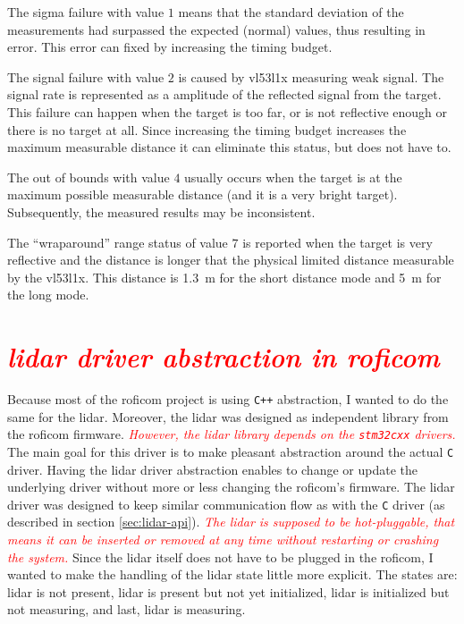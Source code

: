 \documentclass[
  digital,     %
  oneside,     %
  nosansbold,  %
  nocolorbold, %
  lof,         %
  lot,         %
]{fithesis4}
\newcommand{\TODO}[1]{\textcolor{red}{\textit{#1}}}
\begin{document}
{{{The sigma failure with value $1$ means that the standard deviation of the measurements had surpassed the expected (normal) values, thus resulting in error. This error can fixed by increasing the timing budget.

The signal failure with value $2$ is caused by \gls{vl53l1x} measuring weak signal. The signal rate is represented as a amplitude of the reflected signal from the target. This failure can happen when the target is too far, or is not reflective enough or there is no target at all. Since increasing the timing budget increases the maximum measurable distance it can eliminate this status, but does not have to.

The out of bounds with value $4$ usually occurs when the target is at the maximum possible measurable distance (and it is a very bright target). Subsequently, the measured results may be inconsistent.

The ``wraparound'' range status of value $7$ is reported when the target is very reflective and the distance is longer that the physical limited distance measurable by the \gls{vl53l1x}. This distance is \qty{1.3}{\metre} for the short distance mode and \qty{5}{\metre} for the long mode.

\section{ \TODO{ \acrshort{lidar} driver abstraction in \acrshort{roficom} } } \label{sec:lidar-driver}

Because most of the \acrshort{roficom} project is using \verb|C++| abstraction, I wanted to do the same for the \acrshort{lidar}. Moreover, the \acrshort{lidar} was designed as independent library from the \acrshort{roficom} firmware. \TODO{However, the \acrshort{lidar} library depends on the \texttt{stm32cxx} drivers.} The main goal for this driver is to make pleasant abstraction around the actual \verb|C| driver. Having the \acrshort{lidar} driver abstraction enables to change or update the underlying driver without more or less changing the \acrshort{roficom}'s firmware. The \acrshort{lidar} driver was designed to keep similar communication flow as with the \verb|C| driver (as described in section \ref{sec:lidar-api}). \TODO{The \acrshort{lidar} is supposed to be \emph{hot-pluggable}, that means it can be inserted or removed at any time without restarting or crashing the system.} Since the \acrshort{lidar} itself does not have to be plugged in the \acrshort{roficom}, I wanted to make the handling of the \acrshort{lidar} state little more explicit. The states are: \acrshort{lidar} is not present, \acrshort{lidar} is present but not yet initialized, \acrshort{lidar} is initialized but not measuring, and last, \acrshort{lidar} is measuring. 

}}}
\end{document}
